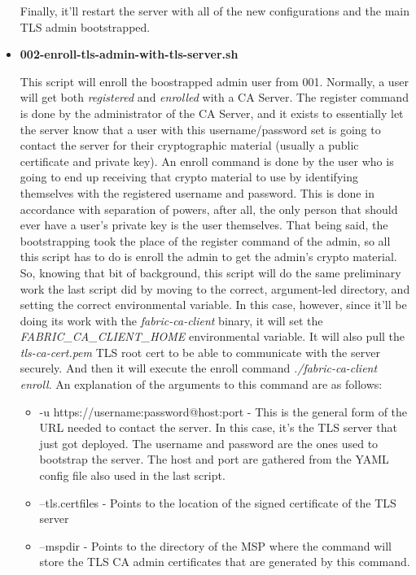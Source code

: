 \begin{itemize}
					\hspace{10mm}Finally, it'll restart the server with all of the new configurations and the main TLS admin bootstrapped.
			
				\item \textbf{002-enroll-tls-admin-with-tls-server.sh}
				
					\hspace{10mm}This script will enroll the boostrapped admin user from 001. Normally, a user will get both \textit{registered} and \textit{enrolled} with a CA Server. The register command is done by the administrator of the CA Server, and it exists to essentially let the server know that a user with this username/password set is going to contact the server for their cryptographic material (usually a public certificate and private key). An enroll command is done by the user who is going to end up receiving that crypto material to use by identifying themselves with the registered username and password. This is done in accordance with separation of powers, after all, the only person that should ever have a user's private key is the user themselves. That being said, the bootstrapping took the place of the register command of the admin, so all this script has to do is enroll the admin to get the admin's crypto material.\\
					
					\hspace{10mm}So, knowing that bit of background, this script will do the same preliminary work the last script did by moving to the correct, argument-led directory, and setting the correct environmental variable. In this case, however, since it'll be doing its work with the \textit{fabric-ca-client} binary, it will set the \textit{FABRIC\_CA\_CLIENT\_HOME} environmental variable. It will also pull the \textit{tls-ca-cert.pem} TLS root cert to be able to communicate with the server securely. And then it will execute the enroll command \textit{./fabric-ca-client enroll}. An explanation of the arguments to this command are as follows:
						\begin{itemize}
							\item -u https://username:password@host:port - This is the general form of the URL needed to contact the server. In this case, it's the TLS server that just got deployed. The username and password are the ones used to bootstrap the server. The host and port are gathered from the YAML config file also used in the last script.
							\item --tls.certfiles - Points to the location of the signed certificate of the TLS server
							\item --mspdir - Points to the directory of the MSP where the command will store the TLS CA admin certificates that are generated by this command.
						\end{itemize}
						

\end{itemize}
